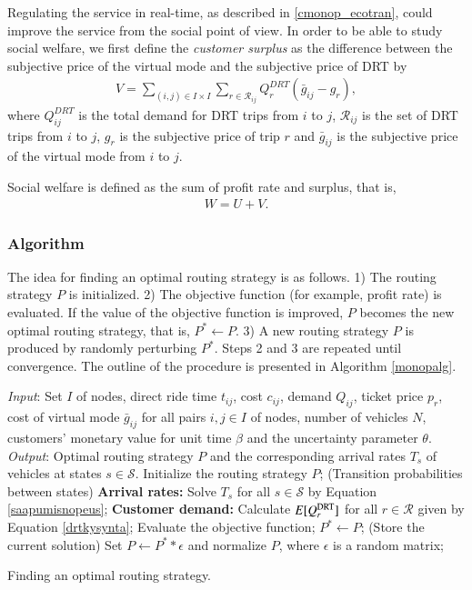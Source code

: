 \documentclass[dissertation,draft*]{aaltoseries}
\begin{document}
Regulating the service in real-time, as described in \ref{cmonop_ecotran}, could improve the service
from the social point of view. In order to be able to study social welfare, we first define the \emph{customer surplus}
as the difference between the subjective price of the virtual mode and 
the subjective price of DRT by
\begin{align}
\label{monopsurplus}
V = \sum_{(i,j) \in I \times I} \sum_{r \in \mathcal{R}_{ij}} Q^{DRT}_r  (\bar{g}_{ij}-g_r),
\end{align}
where $Q^{DRT}_{ij}$ is the total demand for DRT trips from $i$ to $j$, $\mathcal{R}_{ij}$
is the set of DRT trips from $i$ to $j$, $g_r$ is the subjective price
of trip $r$ and $\bar{g}_{ij}$ is the subjective price of the virtual mode from $i$ to $j$.

Social welfare is defined as the sum of profit rate and surplus, that is, 
\begin{align}
\label{monopwelfare}
 W=U+V.
\end{align}

\subsubsection{Algorithm}
The idea for finding an optimal routing strategy is as follows.
1) The routing strategy $P$ is initialized. 
2) The objective function (for example, profit rate) is evaluated. 
If the value of the objective function is improved, $P$ becomes the new optimal routing strategy, that is, $P^* \leftarrow P$.
3) A new routing strategy $P$ is produced by randomly perturbing $P^*$.
Steps 2 and 3 are repeated until convergence.
The outline of the procedure is presented in Algorithm \ref{monopalg}.

\begin{algorithm}[H]
\begin{algorithmic}
\STATE \emph{Input}: Set $I$ of nodes, direct ride time $t_{ij}$, cost $c_{ij}$, demand $Q_{ij}$,
ticket price $p_{r}$, cost of virtual mode $\bar{g}_{ij}$ 
for all pairs $i,j \in I$ of nodes, number of vehicles $N$, 
customers' monetary value for unit time $\beta$
and the uncertainty parameter $\theta$.
\STATE \emph{Output}: Optimal routing strategy $P$ and the corresponding arrival rates $T_s$ of 
vehicles at states $s \in \mathcal{S}$.
\STATE Initialize the routing strategy $P$; \hfill (Transition probabilities between states) 
\REPEAT
\STATE \textbf{Arrival rates:} Solve $T_s$ for all $s \in \mathcal{S}$ by Equation \eqref{saapumisnopeus};
\STATE \textbf{Customer demand:} Calculate $E[Q_{r}^{\rm DRT}]$ for all 
$r \in \mathcal{R}$ given by Equation \eqref{drtkysynta};
\STATE Evaluate the objective function;
\STATE $P^* \leftarrow P$; \hfill (Store the current solution)
\ENDIF
\STATE Set $P \leftarrow P^* * \epsilon$ and normalize $P$, 
where $\epsilon$ is a random matrix; 
\end{algorithmic}
\caption{Finding an optimal routing strategy.}
\label{monopalg}
\end{algorithm}
\end{document}
